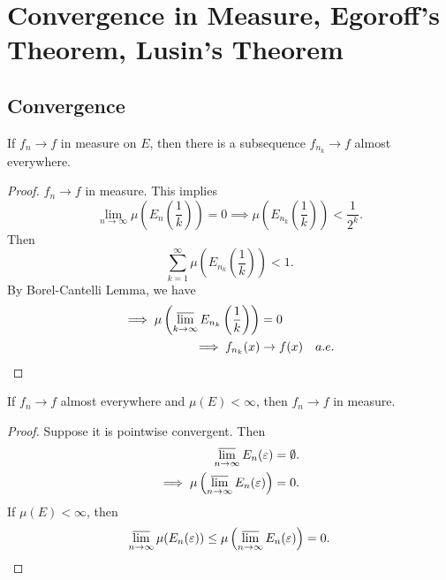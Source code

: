 \documentclass[class=book, crop=false]{standalone}
\begin{document}
    \section{Convergence in Measure, Egoroff’s Theorem, Lusin’s Theorem}
        \subsection{Convergence}
        \begin{theorem}
            If $f_n \rightarrow f$ in measure on $E$, then there is a subsequence $f_{n_k} \rightarrow f$ almost everywhere.
        \end{theorem}
        \begin{proof}
            $f_n \rightarrow f$ in measure. This implies
            \begin{equation*}
                \lim_{n \rightarrow \infty} \mu\left(E_n\left(\frac{1}{k}\right)\right) = 0 \implies \mu\left(E_{n_k}\left(\frac{1}{k}\right)\right) < \frac{1}{2^k}.
            \end{equation*}
            Then
            \begin{equation*}
                \sum^{\infty}_{k = 1} \mu\left(E_{n_k}\left(\frac{1}{k}\right)\right) < 1.
            \end{equation*}
            By Borel-Cantelli Lemma, we have
            \begin{align*}
                \implies \mu\left(\varlimsup_{k \rightarrow \infty} E_{n_k}\left(\frac{1}{k}\right)\right) &= 0 \\
                \implies f_{n_k}(x) &\rightarrow f(x) \quad a.e.
            \end{align*}
        \end{proof}

        \begin{theorem}
            If $f_n \rightarrow f$ almost everywhere and $\mu(E) < \infty$, then $f_n \rightarrow f$ in measure.
        \end{theorem}
        \begin{proof}
            Suppose it is pointwise convergent. Then
            \begin{align*}
                \varlimsup_{n \rightarrow \infty} E_n(\varepsilon) &= \emptyset. \\
                \implies \mu\left(\varlimsup_{n \rightarrow \infty} E_n(\varepsilon)\right) &= 0.
            \end{align*}
            If $\mu(E) < \infty$, then
            \begin{equation*}
                \varlimsup_{n \rightarrow \infty} \mu( E_n(\varepsilon)) \leq \mu\left(\varlimsup_{n \rightarrow \infty} E_n(\varepsilon)\right) = 0.
            \end{equation*}
        \end{proof}
\end{document}
